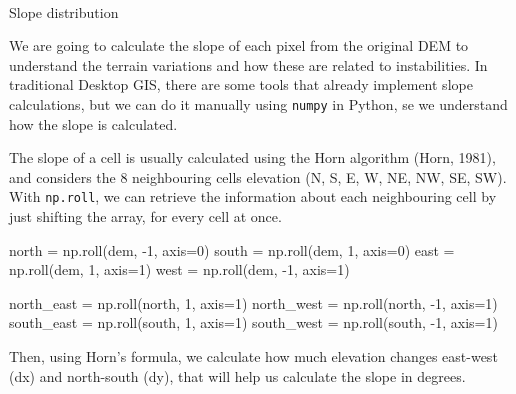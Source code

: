 \documentclass[
  letterpaper,
  DIV=11,
  numbers=noendperiod]{scrartcl}
\makeatletter
\let\oldparagraph\paragraph
\renewcommand{\paragraph}{
    \@ifstar
      \xxxParagraphStar
      \xxxParagraphNoStar
  }
\newcommand{\xxxParagraphStar}[1]{\oldparagraph*{#1}\mbox{}}
\newcommand{\xxxParagraphNoStar}[1]{\oldparagraph{#1}\mbox{}}
\newenvironment{Shaded}{\begin{snugshade}}{\end{snugshade}}
\newcommand{\DecValTok}[1]{\textcolor[rgb]{0.68,0.00,0.00}{#1}}
\newcommand{\NormalTok}[1]{\textcolor[rgb]{0.00,0.23,0.31}{#1}}
\newcommand{\OperatorTok}[1]{\textcolor[rgb]{0.37,0.37,0.37}{#1}}
\makeatother
\begin{document}
\paragraph{Slope distribution}\label{slope-distribution}

We are going to calculate the slope of each pixel from the original DEM
to understand the terrain variations and how these are related to
instabilities. In traditional Desktop GIS, there are some tools that
already implement slope calculations, but we can do it manually using
\texttt{numpy} in Python, se we understand how the slope is calculated.

The slope of a cell is usually calculated using the Horn algorithm
(Horn, 1981), and considers the 8 neighbouring cells elevation (N, S, E,
W, NE, NW, SE, SW). With \texttt{np.roll}, we can retrieve the
information about each neighbouring cell by just shifting the array, for
every cell at once.

\begin{Shaded}
\begin{Highlighting}[]
\NormalTok{north }\OperatorTok{=}\NormalTok{ np.roll(dem, }\OperatorTok{{-}}\DecValTok{1}\NormalTok{, axis}\OperatorTok{=}\DecValTok{0}\NormalTok{)}
\NormalTok{south }\OperatorTok{=}\NormalTok{ np.roll(dem,  }\DecValTok{1}\NormalTok{, axis}\OperatorTok{=}\DecValTok{0}\NormalTok{)}
\NormalTok{east }\OperatorTok{=}\NormalTok{ np.roll(dem,  }\DecValTok{1}\NormalTok{, axis}\OperatorTok{=}\DecValTok{1}\NormalTok{)}
\NormalTok{west }\OperatorTok{=}\NormalTok{ np.roll(dem, }\OperatorTok{{-}}\DecValTok{1}\NormalTok{, axis}\OperatorTok{=}\DecValTok{1}\NormalTok{)}

\NormalTok{north\_east }\OperatorTok{=}\NormalTok{ np.roll(north,  }\DecValTok{1}\NormalTok{, axis}\OperatorTok{=}\DecValTok{1}\NormalTok{)}
\NormalTok{north\_west }\OperatorTok{=}\NormalTok{ np.roll(north, }\OperatorTok{{-}}\DecValTok{1}\NormalTok{, axis}\OperatorTok{=}\DecValTok{1}\NormalTok{)}
\NormalTok{south\_east }\OperatorTok{=}\NormalTok{ np.roll(south,  }\DecValTok{1}\NormalTok{, axis}\OperatorTok{=}\DecValTok{1}\NormalTok{)}
\NormalTok{south\_west }\OperatorTok{=}\NormalTok{ np.roll(south, }\OperatorTok{{-}}\DecValTok{1}\NormalTok{, axis}\OperatorTok{=}\DecValTok{1}\NormalTok{)}
\end{Highlighting}
\end{Shaded}

Then, using Horn's formula, we calculate how much elevation changes
east-west (dx) and north-south (dy), that will help us calculate the
slope in degrees.
\end{document}
